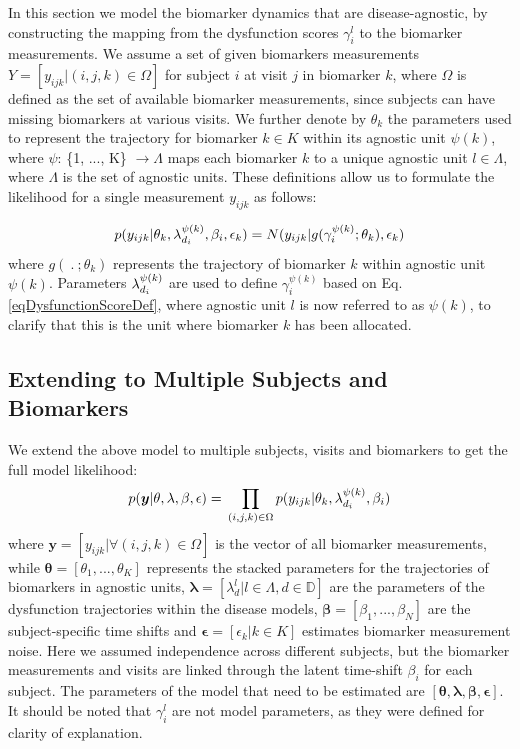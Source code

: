 \documentclass{llncs}
\begin{document}
In this section we model the biomarker dynamics that are disease-agnostic, by constructing the mapping from the dysfunction scores $\gamma_i^l$ to the biomarker measurements. We assume a set of given biomarkers measurements $Y = [y_{ijk} | (i,j,k) \in \Omega]$ for subject $i$ at visit $j$ in biomarker $k$, where $\Omega$ is defined as the set of available biomarker measurements, since subjects can have missing biomarkers at various visits. We further denote by $\theta_k$ the parameters used to represent the trajectory for biomarker $k \in K$ within its agnostic unit $\psi(k)$, where $\psi$: \{1, ..., K\} $ \rightarrow \Lambda$ maps each biomarker $k$ to a unique agnostic unit $l \in \Lambda$, where $\Lambda$ is the set of agnostic units. These definitions allow us to formulate the likelihood for a single measurement $y_{ijk}$ as follows:


\begin{equation}
 p(y_{ijk}|\theta_k, \lambda_{d_i}^{\psi(k)}, \beta_i, \epsilon_k) = N(y_{ijk}| g( \gamma_i^{\psi(k)} ; \theta_k), \epsilon_k)
\end{equation}
where $g(\ .\ ; \theta_k)$ represents the trajectory of biomarker $k$ within agnostic unit $\psi(k)$. Parameters $\lambda_{d_i}^{\psi(k)}$ are used to define $\gamma_i^{\psi(k)}$ based on Eq. \ref{eqDysfunctionScoreDef}, where agnostic unit $l$ is now referred to as $\psi(k)$, to clarify that this is the unit where biomarker $k$ has been allocated. 

\subsection{Extending to Multiple Subjects and Biomarkers}

We extend the above model to multiple subjects, visits and biomarkers to get the full model likelihood:
\begin{equation}
 p(\boldsymbol{y}|\theta, \lambda, \beta , \epsilon) = \\ \prod_{(i,j,k) \in \Omega} p(y_{ijk}|\theta_k, \lambda_{d_i}^{\psi(k)}, \beta_i) 
\end{equation}
where $\boldsymbol{y} = [y_{ijk} | \forall (i,j,k) \in \Omega ]$ is the vector of all biomarker measurements, while $\boldsymbol{\theta} = [\theta_1, ..., \theta_K]$ represents the stacked parameters for the trajectories of biomarkers in agnostic units, $\boldsymbol{\lambda} = [\lambda_d^{l}|l \in \Lambda, d \in \mathbb{D}]$ are the parameters of the dysfunction trajectories within the disease models, $\boldsymbol{\beta} =[\beta_1, ..., \beta_N]$ are the subject-specific time shifts and $\boldsymbol{\epsilon} = [\epsilon_k | k \in K]$  estimates biomarker measurement noise. Here we assumed independence across different subjects, but the biomarker measurements and visits are linked through the latent time-shift $\beta_i$ for each subject. The parameters of the model that need to be estimated are $[\boldsymbol{\theta}, \boldsymbol{\lambda}, \boldsymbol{\beta}, \boldsymbol{\epsilon}]$. It should be noted that $\gamma_i^l$ are not model parameters, as they were defined for clarity of explanation.
\end{document}
